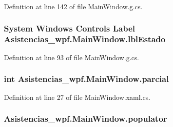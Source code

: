 Definition at line 142 of file Main\-Window.\-g.\-cs.

\hypertarget{class_asistencias__wpf_1_1_main_window_a225a06fc8dd74f56e03caad3b7eaf6ab}{
\subsubsection[{lbl\-Estado}]{\setlength{\rightskip}{0pt plus 5cm}System Windows Controls Label Asistencias\-\_\-wpf.\-Main\-Window.\-lbl\-Estado\hspace{0.3cm}{\ttfamily [package]}}}\label{class_asistencias__wpf_1_1_main_window_a225a06fc8dd74f56e03caad3b7eaf6ab}


Definition at line 93 of file Main\-Window.\-g.\-cs.

\hypertarget{class_asistencias__wpf_1_1_main_window_ac8fa133c53bfc0374475a1efb34409c9}{
\subsubsection[{parcial}]{\setlength{\rightskip}{0pt plus 5cm}int Asistencias\-\_\-wpf.\-Main\-Window.\-parcial\hspace{0.3cm}{\ttfamily [private]}}}\label{class_asistencias__wpf_1_1_main_window_ac8fa133c53bfc0374475a1efb34409c9}


Definition at line 27 of file Main\-Window.\-xaml.\-cs.

\hypertarget{class_asistencias__wpf_1_1_main_window_a89b2a643d361e6926255fc1a1906b022}{
\subsubsection[{populator}]{ Asistencias\-\_\-wpf.\-Main\-Window.\-populator\hspace{0.3cm}{\ttfamily [private]}}}\label{class_asistencias__wpf_1_1_main_window_a89b2a643d361e6926255fc1a1906b022}


